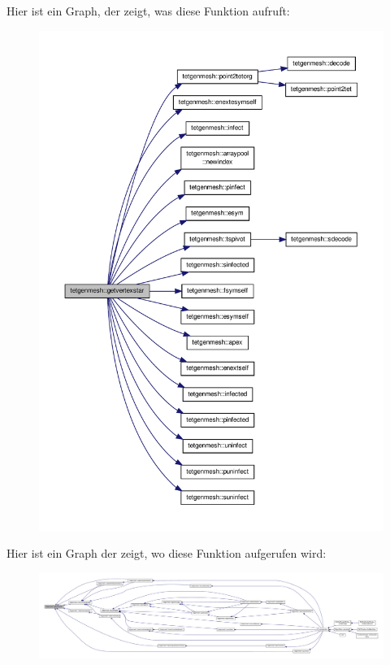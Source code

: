 Hier ist ein Graph, der zeigt, was diese Funktion aufruft\-:
\nopagebreak
\begin{figure}[H]
\begin{center}
\leavevmode
\includegraphics[width=350pt]{classtetgenmesh_a9ba3540239e05588c5a2021b15d89a8e_cgraph}
\end{center}
\end{figure}




Hier ist ein Graph der zeigt, wo diese Funktion aufgerufen wird\-:
\nopagebreak
\begin{figure}[H]
\begin{center}
\leavevmode
\includegraphics[width=350pt]{classtetgenmesh_a9ba3540239e05588c5a2021b15d89a8e_icgraph}
\end{center}
\end{figure}


